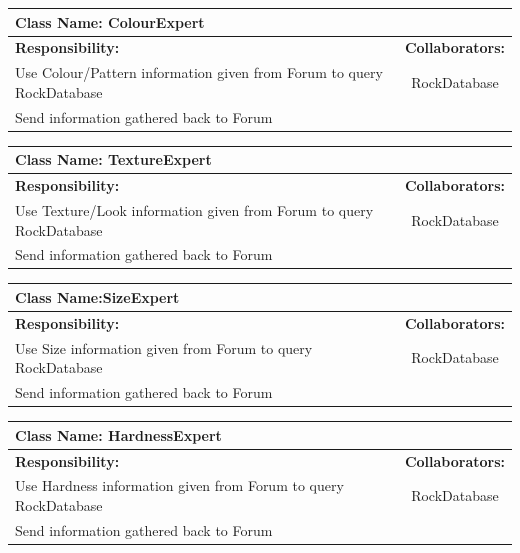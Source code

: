 \documentclass[titlepage]{article}
\begin{document}
\begin{table}[!ht]
	\centering
	\begin{tabular}{| p{8cm} | c |} \hline
		\multicolumn{2}{|l|}{\textbf{Class Name: ColourExpert}} \\ \hline
		\textbf{Responsibility:} & \textbf{Collaborators:} \\ \hline
		Use Colour/Pattern information given from Forum to query RockDatabase & RockDatabase\\ \hline
		Send information gathered back to Forum & \\ \hline
	\end{tabular}
\end{table}

\begin{table}[!ht]
	\centering
	\begin{tabular}{| p{8cm} | c |} \hline
		\multicolumn{2}{|l|}{\textbf{Class Name: TextureExpert}} \\ \hline
		\textbf{Responsibility:} & \textbf{Collaborators:} \\ \hline
		Use Texture/Look information given from Forum to query RockDatabase & RockDatabase\\ \hline
		Send information gathered back to Forum & \\ \hline
	\end{tabular}
\end{table}

\begin{table}[!ht]
	\centering
	\begin{tabular}{| p{8cm} | c |} \hline
		\multicolumn{2}{|l|}{\textbf{Class Name:SizeExpert}} \\ \hline
		\textbf{Responsibility:} & \textbf{Collaborators:} \\ \hline
		Use Size information given from Forum to query RockDatabase & RockDatabase\\ \hline
		Send information gathered back to Forum & \\ \hline
	\end{tabular}
\end{table}

\begin{table}[!ht]
	\centering
	\begin{tabular}{| p{8cm} | c |} \hline 
		\multicolumn{2}{|l|}{\textbf{Class Name: HardnessExpert}} \\ \hline
		\textbf{Responsibility:} & \textbf{Collaborators:} \\ \hline
		Use Hardness information given from Forum to query RockDatabase & RockDatabase\\ \hline
		Send information gathered back to Forum & \\ \hline
	\end{tabular}
\end{table}
\end{document}
